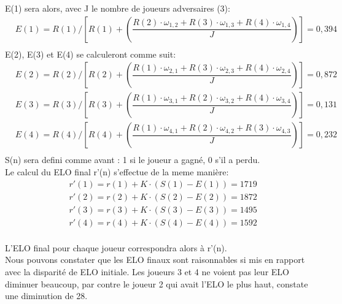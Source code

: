         E(1) sera alors, avec J le nombre de joueurs adversaires (3): 
        \begin{equation}
            \begin{split}
                & E(1) = R(1) / [R(1) + (\dfrac{R(2) \cdot \omega_{1, 2} + R(3) \cdot \omega_{1, 3} + R(4) \cdot \omega_{1, 4}}{J})] = 0,394 \\
            \end{split}
        \end{equation}
        E(2), E(3) et E(4) se calculeront comme suit:
        \begin{equation}
            \begin{split}
                & E(2) = R(2) / [R(2) + (\dfrac{R(1) \cdot \omega_{2, 1} + R(3) \cdot \omega_{2, 3} + R(4) \cdot \omega_{2,4} }{J})] = 0,872 \\
                & E(3) = R(3) / [R(3) + (\dfrac{R(1) \cdot \omega_{3, 1} + R(2) \cdot \omega_{3, 2} + R(4) \cdot \omega_{3,4} }{J})] = 0,131 \\
                & E(4) = R(4) / [R(4) + (\dfrac{R(1) \cdot \omega_{4, 1} + R(2) \cdot \omega_{4, 2} + R(3) \cdot \omega_{4,3} }{J})] = 0,232 \\
            \end{split}
        \end{equation}
        S(n) sera defini comme avant : 1 si le joueur a gagné, 0 s'il a perdu. \\
        
        Le calcul du ELO final r'(n) s'effectue de la meme manière:
        \begin{equation}
            \begin{split}
                & r'(1) = r(1) + K \cdot (S(1) - E(1)) = 1719 \\
                & r'(2) = r(2) + K \cdot (S(2) - E(2)) = 1872 \\
                & r'(3) = r(3) + K \cdot (S(3) - E(3)) = 1495 \\
                & r'(4) = r(4) + K \cdot (S(4) - E(4)) = 1592 \\
            \end{split}
        \end{equation}

        L'ELO final pour chaque joueur correspondra alors à r'(n). \\
        Nous pouvons constater que les ELO finaux sont raisonnables si mis en rapport avec la disparité de ELO initiale. Les joueurs 3 et
        4 ne voient pas leur ELO diminuer beaucoup, par contre le joueur 2 qui avait l'ELO le plus haut, constate une diminution de 28.
